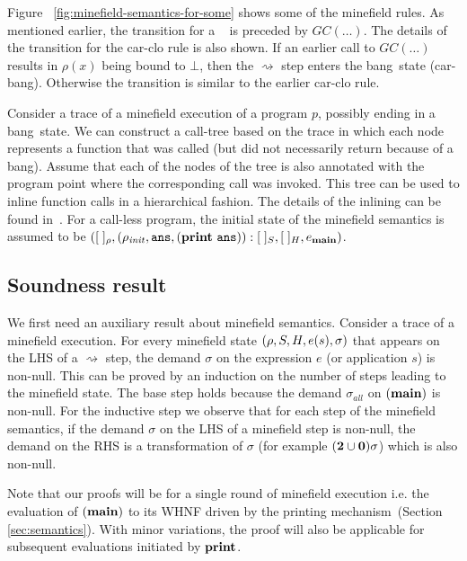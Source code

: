 \documentclass[9pt,preprint,letter,nonatbib]{sigplanconf}
\newcommand{\bang}{\mbox{\sc bang}}
\begin{document}
Figure ~\ref{fig:minefield-semantics-for-some} shows some of the
minefield rules. As mentioned earlier, the transition for a \LET\ 
is preceded  by $GC(\ldots)$.  The details of the transition for the {\sc
  car-clo}  rule   is  also shown.  If    an
earlier  call to  $GC(\ldots)$  results  in $\rho(x)$  being
bound  to  $\bot$,  then  the  $\rightsquigarrow$  step
enters the  \bang\ state ({\sc  car-bang}). Otherwise
the transition is similar to the earlier {\sc car-clo}
rule. 



Consider a trace  of a minefield execution of a  program $p$, possibly
ending in  a \bang\ state. We  can construct a call-tree  based on the
trace in  which each node represents  a function that was  called (but
did not necessarily  return because of a \bang).  Assume  that each of
the nodes of  the tree is also annotated with  the program point where
the corresponding call  was invoked.  This tree can be  used to inline
function calls in a hierarchical fashion.  The details of the inlining
can be found in~\cite{asati14lgc}.
For  a
call-less program,  the initial state of  the minefield
semantics  is  assumed  to  be  $([\;]_\rho,(\rho_\mathit{init},
\mathbf{\mbox{\tt ans}},      (\mathbf{print}~\mathbf{\mbox{\tt ans}})):[\;]_{S}     ,      [\;]_{H},
e_{\mathbf{main}})$.
   
 
\subsection{Soundness result}
We first need an auxiliary  result about minefield semantics. Consider
a trace of  a minefield execution.  For every  minefield state $(\rho,
S,   H,  e(s),   \sigma)$   that   appears  on   the   LHS  of   a
$\rightsquigarrow$ step, the demand $\sigma$ on the expression $e$ (or
application $s$) is  non-null.  This can be proved by  an induction on
the number  of steps leading  to the  minefield state.  The  base step
holds   because  the   demand   $\sigma_{\mathit{all}}$   on  $(\mathbf{main})$   is
non-null. For the inductive step we  observe that for each step of the
minefield semantics, if the demand $\sigma$  on the LHS of a minefield
step  is non-null,  the  demand  on the  RHS  is  a transformation  of
$\sigma$ (for example $({\mathbf{2}}\cup\mathbf{0})\sigma$) which is also non-null.

Note that our proofs will be for a single round of minefield execution
i.e.  the evaluation of  $(\mathbf{main})$  to   its  WHNF  driven  by   the  printing  mechanism~(Section
\ref{sec:semantics}).  With  minor variations,  the proof will  also be
applicable for subsequent evaluations initiated by $\mathbf{print}$.
\end{document}
